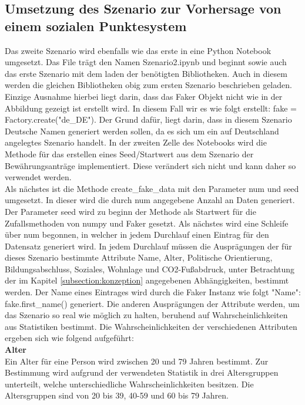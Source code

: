 \begin{onehalfspace}
\subsection{Umsetzung des Szenario zur Vorhersage von einem sozialen Punktesystem}
\label{umsetzungsz2}
Das zweite Szenario wird ebenfalls wie das erste in eine Python Notebook umgesetzt. Das File trägt den Namen \glqq{}Szenario2.ipynb\grqq{} und beginnt sowie auch das erste Szenario mit dem laden der benötigten Bibliotheken. Auch in diesem werden die gleichen Bibliotheken obig zum ersten Szenario beschrieben geladen. Einzige Ausnahme hierbei liegt darin, dass das Faker Objekt nicht wie in der Abbildung gezeigt ist erstellt wird. In diesem Fall wir es wie folgt erstellt: \glqq{}fake = Factory.create("de\_DE")\grqq{}. Der Grund dafür, liegt darin, dass in diesem Szenario Deutsche Namen generiert werden sollen, da es sich um ein auf Deutschland angelegtes Szenario handelt. In der zweiten Zelle des Notebooks wird die Methode für das erstellen eines Seed/Startwert aus dem Szenario der Bewährungsanträge implementiert. Diese verändert sich nicht und kann daher so verwendet werden.\\
Als nächstes ist die Methode \glqq{}create\_fake\_data\grqq{} mit den Parameter num und seed umgesetzt. In dieser wird die durch num angegebene Anzahl an Daten generiert. Der Parameter seed wird zu beginn der Methode als Startwert für die Zufallsmethoden von numpy und Faker gesetzt. Als nächstes wird eine Schleife über num begonnen, in welcher in jedem Durchlauf einen Eintrag für den Datensatz generiert wird. In jedem Durchlauf müssen die Ausprägungen der für dieses Szenario bestimmte Attribute Name, Alter, Politische Orientierung, Bildungsabschluss, Soziales, Wohnlage und CO2-Fußabdruck, unter Betrachtung der im Kapitel \ref{subsection:konzeption} angegebenen Abhängigkeiten, bestimmt werden. Der Name eines Eintrages wird durch die Faker Instanz wie folgt \glqq{}"Name": fake.first\_name()\grqq{} generiert. Die anderen Ausprägungen der Attribute werden, um das Szenario so real wie möglich zu halten, beruhend auf Wahrscheinlichkeiten aus Statistiken bestimmt. Die Wahrscheinlichkeiten der verschiedenen Attributen ergeben sich wie folgend aufgeführt:\\
\textbf{Alter}\\
Ein Alter für eine Person wird zwischen 20 und 79 Jahren bestimmt. Zur Bestimmung wird aufgrund der verwendeten Statistik in drei Altersgruppen unterteilt, welche unterschiedliche Wahrscheinlichkeiten besitzen. Die Altersgruppen sind von 20 bis 39, 40-59 und 60 bis 79 Jahren.\\

\end{onehalfspace}
